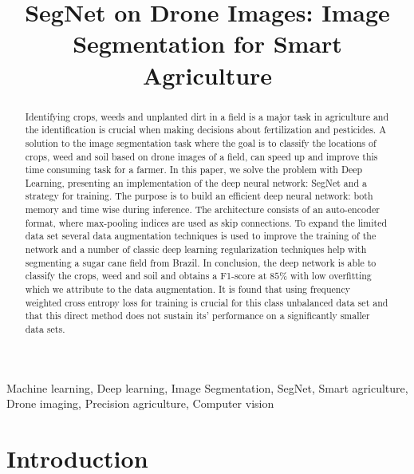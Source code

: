 \documentclass{article}
\title{SegNet on Drone Images: Image Segmentation for Smart Agriculture}
\begin{document}
%

\maketitle
%
\begin{abstract}
Identifying crops, weeds and unplanted dirt in a field is a major task in agriculture and the identification is crucial when making decisions about fertilization and pesticides.
A solution to the image segmentation task where the goal is to classify the locations  of crops, weed and soil based on drone images of a field, can speed up and improve this time consuming task for a farmer. 
In this paper, we solve the problem with Deep Learning, presenting an implementation of the deep neural network: SegNet and a strategy for training.
The purpose is to build an efficient deep neural network: both memory and time wise during inference. 
The architecture consists of an auto-encoder format, where max-pooling indices are used as skip connections.
To expand the limited data set several data augmentation techniques is used to improve the training of the network and a number of classic deep learning regularization techniques help with segmenting a sugar cane field from Brazil.
In conclusion, the deep network is able to classify the crops, weed and soil and obtains a F1-score at $ 85 \% $ with low overfitting which we attribute to the data augmentation.
It is found that using frequency weighted cross entropy loss for training is crucial for this class unbalanced data set and that this direct method does not sustain its' performance on a significantly smaller data sets. 
\end{abstract}
%
\begin{keywords}
Machine learning, Deep learning, Image Segmentation, SegNet, Smart agriculture, Drone imaging, Precision agriculture, Computer vision
\end{keywords}
%
\section{Introduction}
\label{sec:intro}
\end{document}
